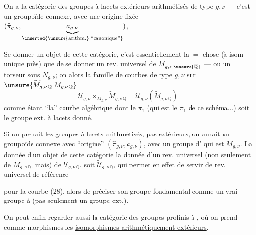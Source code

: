 On a la catégorie des groupes à lacets  extérieurs arithmétisés de type $g,\nu$ --- c'est un groupoïde connexe, avec une origine fixée $(\widehat{\pi}_{g,\nu},\underbrace{a_{g,\nu}}_{\inserted{\text{\unsure{arithm.} ``canonique''}}})$,

Se donner un objet de cette catégorie, c'est essentiellement la $=$ chose (à isom unique près) que de se donner un rev. universel  de $M_{g,\nu\,\unsure{\overline{\mathbb Q}}}$ --- ou un torseur sous $N_{g,\nu}$; on  alors la famille de courbes de type $g,\nu$ sur $\unsure{\widetilde M_{g,\nu\,\mathbb Q}|M_{g,\nu\,\mathbb Q}}$
\[
 \mathcal U_{g,\nu}\times_{M_{g,\nu}}\widetilde M_{g,\nu\,\mathbb Q}
 =\mathcal U_{g,\nu}(\widetilde M_{g,\nu\,\mathbb Q})
\tag{28}
\]
comme étant ``la'' courbe algébrique dont le $\pi_1$  (qui est  le $\pi_1$ de ce schéma...) soit le groupe ext. à lacets donné.

Si on prenait les groupes à lacets arithmétisés, pas extérieurs, on aurait  un groupoïde connexe avec ``origine'' $(\widehat{\pi}_{g,\nu},a_{g,\nu})$, avec un groupe d' qui est $M_{g,\nu}$. La donnée d'un objet de cette catégorie   la donnée d'un rev. universel (non seulement de $M_{g,\nu\,\mathbb Q}$, mais) de $\mathcal U_{g,\nu\,\mathbb Q}$, soit $\widetilde{\mathcal U}_{g,\nu\,\mathbb Q}$, qui permet en effet de servir de rev. universel de référence

pour la courbe  (28),  alors de préciser son groupe fondamental comme un vrai groupe à  (pas seulement un groupe ext.).

On peut enfin regarder aussi la catégorie des groupes profinis à  , où on prend comme morphismes les \uline{isomorphismes arithmétiquement extérieurs}.

